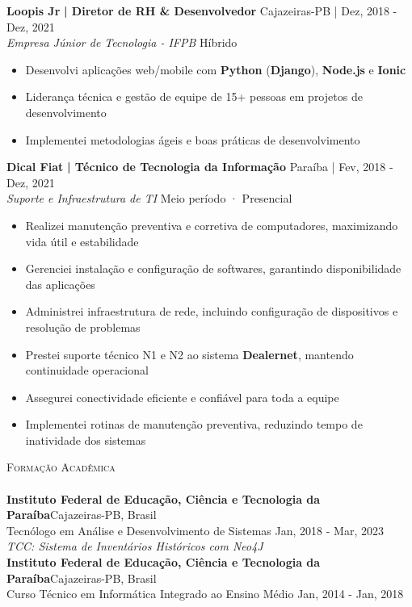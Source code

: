 \documentclass[a4paper]{article}
\newcommand{\lineunder}{
    \vspace*{-8pt} \\
    \hspace*{-18pt} \hrulefill \\
}
\newcommand{\header}[1]{
    {\hspace*{-18pt}\vspace*{6pt} \textsc{#1}}
    \vspace*{-6pt} \lineunder
}
\begin{document}
\textbf{Loopis Jr}\textbf{ | Diretor de RH \& Desenvolvedor} \hfill Cajazeiras-PB | Dez, 2018 - Dez, 2021\\
\textit{Empresa Júnior de Tecnologia - IFPB} \hfill Híbrido\\
\vspace{-3mm}
\begin{itemize} \itemsep -3pt
    \item Desenvolvi aplicações web/mobile com \textbf{Python} (\textbf{Django}), \textbf{Node.js} e \textbf{Ionic}
    \item Liderança técnica e gestão de equipe de 15+ pessoas em projetos de desenvolvimento
    \item Implementei metodologias ágeis e boas práticas de desenvolvimento
\end{itemize}

\textbf{Dical Fiat}\textbf{ | Técnico de Tecnologia da Informação} \hfill Paraíba | Fev, 2018 - Dez, 2021\\
\textit{Suporte e Infraestrutura de TI} \hfill Meio período · Presencial\\
\vspace{-3mm}
\begin{itemize} \itemsep -3pt
    \item Realizei manutenção preventiva e corretiva de computadores, maximizando vida útil e estabilidade
    \item Gerenciei instalação e configuração de softwares, garantindo disponibilidade das aplicações
    \item Administrei infraestrutura de rede, incluindo configuração de dispositivos e resolução de problemas
    \item Prestei suporte técnico N1 e N2 ao sistema \textbf{Dealernet}, mantendo continuidade operacional
    \item Assegurei conectividade eficiente e confiável para toda a equipe
    \item Implementei rotinas de manutenção preventiva, reduzindo tempo de inatividade dos sistemas
\end{itemize}

%
%
\header{Formação Acadêmica}
\vspace{2mm}
\textbf{Instituto Federal de Educação, Ciência e Tecnologia da Paraíba}\hfill Cajazeiras-PB, Brasil\\
Tecnólogo em Análise e Desenvolvimento de Sistemas \hfill Jan, 2018 - Mar, 2023\\
{\sl TCC: Sistema de Inventários Históricos com Neo4J }\\
\vspace{2mm}
\textbf{Instituto Federal de Educação, Ciência e Tecnologia da Paraíba}\hfill Cajazeiras-PB, Brasil\\
Curso Técnico em Informática Integrado ao Ensino Médio \hfill Jan, 2014 - Jan, 2018\\
\vspace{2mm}
\end{document}

